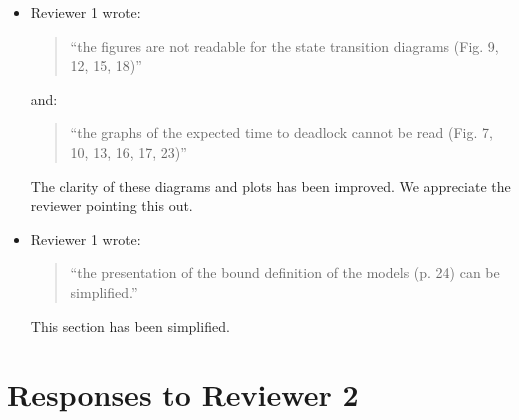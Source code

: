 \documentclass{article}
\begin{document}
\begin{itemize}
\item Reviewer 1 wrote:
\begin{quote}
``the figures are not readable for the state transition diagrams (Fig. 9, 12,
15, 18)''
\end{quote}

and:

\begin{quote}
``the graphs of the expected time to deadlock cannot be read (Fig. 7, 10, 13,
16, 17, 23)''
\end{quote}

The clarity of these diagrams and plots has been improved.
We appreciate the reviewer pointing this out.


\item Reviewer 1 wrote:
\begin{quote}
``the presentation of the bound definition of the models (p. 24) can be
simplified.''
\end{quote}
This section has been simplified.

\end{itemize}



\section*{Responses to Reviewer 2}
\end{document}
